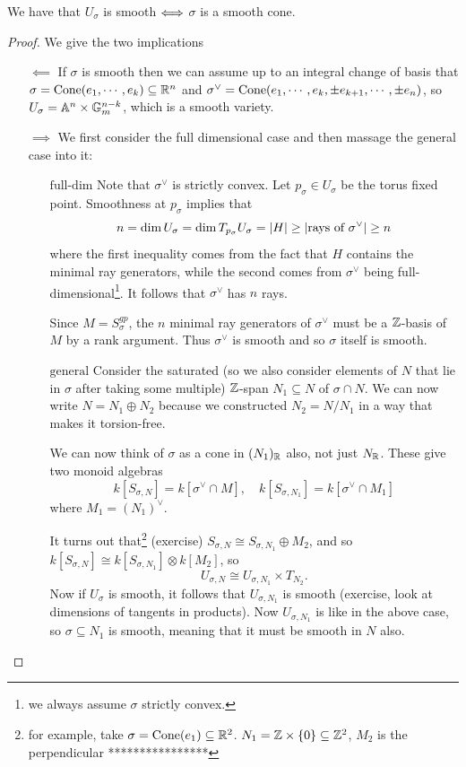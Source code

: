 \begin{theorem}[]\label{ThSmoothAffineToricVarietyIffSmoothCone}
We have that $U_\sigma$ is smooth $\Longleftrightarrow$ $\sigma$ is a smooth cone.
\end{theorem}
\begin{proof}
We give the two implications
\setlength{\leftmargini}{0cm}
\begin{itemize}
\item[$\boxed{\impliedby}$] If $\sigma$ is smooth then we can assume up to an integral change of basis that $\sigma=\operatorname{Cone}(e_1,\cdots, e_k)\subseteq \mathbb{R}^n$ and $\sigma^\vee=\operatorname{Cone}(e_1,\cdots, e_k,\pm e_{k+1},\cdots, \pm e_n)$, so $U_\sigma=\mathbb{A}^n\times \mathbb{G}_m^{n-k}$, which is a smooth variety.
\item[$\boxed{\implies}$] We first consider the full dimensional case and then massage the general case into it:
\setlength{\leftmargini}{0cm}
\begin{itemize}
\item [$\boxed{\text{full-dim}}$] Note that $\sigma^\vee$ is strictly convex. Let $p_\sigma\in U_\sigma$ be the torus fixed point. Smoothness at $p_\sigma$ implies that
\[n=\dim U_\sigma=\dim T_{p_\sigma}U_\sigma=\left|{H}\right|\geq \left|{\text{rays of }\sigma^\vee}\right|\geq n\]
where the first inequality comes from the fact that $H$ contains the minimal ray generators, while the second comes from $\sigma^\vee$ being full-dimensional\footnote{we always assume $\sigma$ strictly convex.}. It follows that $\sigma^\vee$ has $n$ rays. 

Since $M=S_\sigma^{gp}$, the $n$ minimal ray generators of $\sigma^\vee$ must be a $\mathbb{Z}$-basis of $M$ by a rank argument. Thus $\sigma^\vee$ is smooth and so $\sigma$ itself is smooth.
\item [$\boxed{\text{general}}$] Consider the saturated (so we also consider elements of $N$ that lie in $\sigma$ after taking some multiple) $\mathbb{Z}$-span $N_1\subseteq N$ of $\sigma\cap N$. We can now write $N=N_1\oplus N_2$ because we constructed $N_2=N/N_1$ in a way that makes it torsion-free.

We can now think of $\sigma$ as a cone in $(N_1)_{\mathbb{R}}$ also, not just $N_{\mathbb{R}}$. These give two monoid algebras
\[k[S_{\sigma,N}]=k[\sigma^\vee\cap M],\quad k[S_{\sigma,N_1}]=k[\sigma^\vee\cap M_1]\]
where $M_1=(N_1)^\vee$.

It turns out that\footnote{for example, take $\sigma=\operatorname{Cone}(e_1)\subseteq \mathbb{R}^2$. $N_1=\mathbb{Z}\times \left\{{0}\right\}\subseteq \mathbb{Z}^2$, $M_2$ is the perpendicular ****************} (exercise) $S_{\sigma,N}\cong S_{\sigma,N_1}\oplus M_2$, and so $k[S_{\sigma,N}]\cong k[S_{\sigma,N_1}]\otimes k[M_2]$, so
\[U_{\sigma,N}\cong U_{\sigma,N_1}\times T_{N_2}.\]
Now if $U_{\sigma}$ is smooth, it follows that $U_{\sigma,N_1}$ is smooth (exercise, look at dimensions of tangents in products). Now $U_{\sigma,N_1}$ is like in the above case, so $\sigma\subseteq N_1$ is smooth, meaning that it must be smooth in $N$ also.
\end{itemize}
\setlength{\leftmargini}{0.5cm}
\end{itemize}
\setlength{\leftmargini}{0.5cm}
\end{proof}

